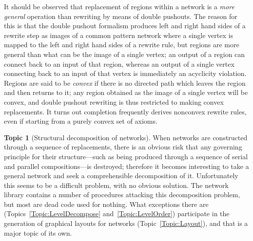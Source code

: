 \documentclass{article}
\theoremstyle{definition}
\newtheorem{topic}{Topic}
\begin{document}
It should be observed that replacement of regions within a network is 
a \emph{more general} operation than rewriting by means of double 
pushouts. The reason for this is that the double pushout formalism 
produces left and right hand sides of a rewrite step as images of a 
common pattern network where a single vertex is mapped to the left 
and right hand sides of a rewrite rule, but regions are more general 
than what can be the image of a single vertex; an output of a region 
can connect back to an input of that region, whereas an output of a 
single vertex connecting back to an input of that vertex is 
immediately an acyclicity violation. Regions are said to be 
\emph{convex} if there is no directed path which leaves the region 
and then returns to it; any region obtained as the image of a single 
vertex will be convex, and double pushout rewriting is thus 
restricted to making convex replacements. It turns out completion 
frequently derives nonconvex rewrite rules, even if starting from a 
purely convex set of axioms.

\begin{topic}[Structural decomposition of networks] \label{Topic:NwDecompose}
  When networks are constructed through a sequence of replacements, 
  there is an obvious risk that any governing principle for their 
  structure---such as being produced through a sequence of serial and 
  parallel compositions---is destroyed; therefore it becomes 
  interesting to take a general network and seek a comprehensible 
  decomposition of it. Unfortunately this seems to be a difficult 
  problem, with no obvious solution. The network library contains a 
  number of procedures attacking this decomposition problem, but most 
  are dead code used for nothing. What exceptions there are 
  (Topics~\ref{Topic:LevelDecompose} and~\ref{Topic:LevelOrder}) 
  participate in the generation of graphical layouts for networks 
  (Topic~\ref{Topic:Layout}), and that is a major topic of its own.
\end{topic}
\end{document}
